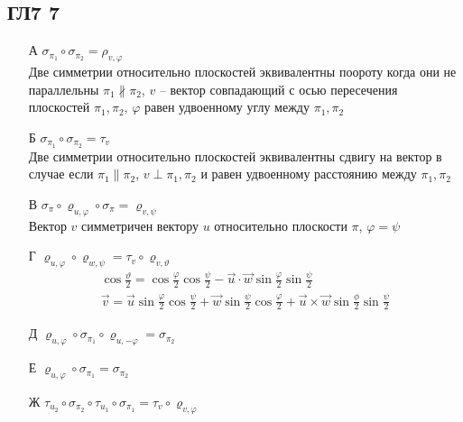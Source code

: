 \subsection*{ГЛ7 7}
\begin{enumerate}
\item[А] $\sigma_{\pi_{1}} \circ \sigma_{\pi_{2}}=\rho_{v, \varphi}$\\
	Две симметрии относительно плоскостей эквивалентны поороту когда они не параллельны $\pi_1 \not\parallel \pi_2$, $v$ -- вектор совпадающий с осью пересечения плоскостей $\pi_1, \pi_2$, $\varphi$ равен удвоенному углу между $\pi_1, \pi_2$
			
\item[Б] $\sigma_{\pi_{1}} \circ \sigma_{\pi_{2}}=\tau_{v}$\\
	Две симметрии относительно плоскостей эквивалентны сдвигу на вектор в случае если $\pi_1 \parallel \pi_2$, $v \perp \pi_1, \pi_2$ и равен удвоенному расстоянию между $\pi_1, \pi_2$
		
\item[В] $\sigma_{\pi} \circ \varrho_{u, \varphi} \circ \sigma_{\pi}=\varrho_{v, \psi}$\\
	Вектор $v$ симметричен вектору $u$ относительно плоскости $\pi$, $\varphi = \psi$
				
\item[Г] $\varrho_{u, \varphi} \circ \varrho_{w, \psi}=\tau_{v} \circ \varrho_{v, \vartheta}$
	\begin{gather*}
		\cos \frac{\vartheta}{2}=\cos \frac{\varphi}{2} \cos \frac{\psi}{2}-\vec{u} \cdot \vec{w} \sin \frac{\varphi}{2} \sin \frac{\psi}{2}\\
		\vec{v}=\vec{u} \sin \frac{\varphi}{2} \cos \frac{\psi}{2}+\vec{w} \sin \frac{\psi}{2} \cos \frac{\varphi}{2}+\vec{u} \times \vec{w} \sin \frac{\phi}{2} \sin \frac{\psi}{2}
	\end{gather*}
			
		
\item[Д] $\varrho_{u, \varphi} \circ \sigma_{\pi_{1}} \circ \varrho_{u,-\varphi}=\sigma_{\pi_{2}}$\\
		
\item[Е] $\varrho_{u, \varphi} \circ \sigma_{\pi_{1}}=\sigma_{\pi_{2}}$\\
		
\item[Ж] $\tau_{u_{2}} \circ \sigma_{\pi_{2}} \circ \tau_{u_{1}} \circ \sigma_{\pi_{1}}=\tau_{v} \circ \varrho_{v, \varphi}$\\
\end{enumerate}
		